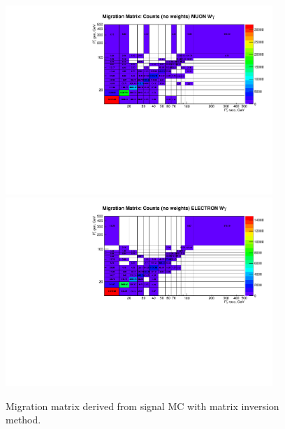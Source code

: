 \begin{figure}[htb]
  \begin{center}
   \includegraphics[width=0.90\textwidth]{../figs/figs_v11/MUON_WGamma/Constants/cMigrMatrix_MUON_WGamma__yield_pm_stat.pdf}\\
\includegraphics[width=0.90\textwidth]{../figs/figs_v11/ELECTRON_WGamma/Constants/cMigrMatrix_ELECTRON_WGamma__yield_pm_stat.pdf}
  \caption{Migration matrix derived from signal MC with matrix inversion method.}
  \label{fig:migrMatrices_Wg}
  \end{center}
\end{figure}

